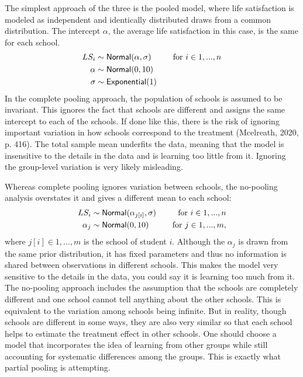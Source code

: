 \documentclass[a4, 12pt]{article}
\begin{document}
The simplest approach of the three is the pooled model, where life satisfaction is modeled as independent and identically distributed draws from a common distribution. The intercept \(\alpha\), the average life satisfaction in this case, is the same for each school.
\begin{align*}
LS_i & \sim {\sf {Normal}} (\alpha, \sigma) & \quad \text{for } i \in 1,...,n \\
\alpha & \sim {\sf Normal} (0, 10) \\
\sigma & \sim {\sf Exponential} (1)
\end{align*}
In the complete pooling approach, the population of schools is assumed to be invariant. This ignores the fact that schools are different and assigns the same intercept to each of the schools. If done like this, there is the risk of ignoring important variation in how schools correspond to the treatment (Mcelreath, 2020, p. 416). The total sample mean underfits the data, meaning that the model is insensitive to the details in the data and is learning too little from it. Ignoring the group-level variation is very likely misleading.

Whereas complete pooling ignores variation between schools, the no-pooling analysis overstates it and gives a different mean to each school:
\begin{align*}
LS_i & \sim {\sf Normal} (\alpha_{j[i]}, \sigma) & \quad \text{for } i \in 1,...,n \\
\alpha_{j} & \sim {\sf Normal} (0, 10) & \quad \text{for } j \in 1,...,m,
\end{align*}
where \(j[i] \in 1,...,m\) is the school of student \(i\).
Although the \(\alpha_j\) is drawn from the same prior distribution, it has fixed parameters and thus no information is shared between observations in different schools. This makes the model very sensitive to the details in the data, you could say it is learning too much from it. The no-pooling approach includes the assumption that the schools are completely different and one school cannot tell anything about the other schools. This is equivalent to the variation among schools being infinite. But in reality, though schools are different in some ways, they are also very similar so that each school helps to estimate the treatment effect in other schools. One should choose a model that incorporates the idea of learning from other groups while still accounting for systematic differences among the groups. This is exactly what partial pooling is attempting.
\end{document}
